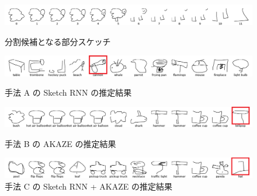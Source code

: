 \documentclass[twocolumn]{jarticle}     %
\begin{document}
\begin{figure}[tb]

 \begin{minipage}{1\hsize}
 	\begin{center}
 		\includegraphics[clip,width=160mm]{origin.png}
 		\caption{分割候補となる部分スケッチ}
 		\label{fig:exp2_o}
 	\end{center}
 \end{minipage}
\vspace{2zh}

  \begin{minipage}{1\hsize}
  	\begin{center}
  		\includegraphics[clip,width=160mm]{sheep_a.png}
  		\caption{手法 A の Sketch RNN の推定結果}
  		\label{fig:exp2_a}
  	\end{center}
  \end{minipage}
 \vspace{1.5zh}

   \begin{minipage}{1\hsize}
     \begin{center}
       \includegraphics[clip,width=160mm]{sheep_b.png}
       \caption{手法 B の AKAZE の推定結果}
       \label{fig:exp2_b}
     \end{center}
   \end{minipage}
  \vspace{1.5zh}

    \begin{minipage}{1\hsize}
      \begin{center}
        \includegraphics[clip,width=160mm]{sheep_c.png}
        \caption{手法 C の Sketch RNN + AKAZE の推定結果}
        \label{fig:exp2_c}
      \end{center}
    \end{minipage}

    \vspace{1zh}

\end{figure}
\end{document}
